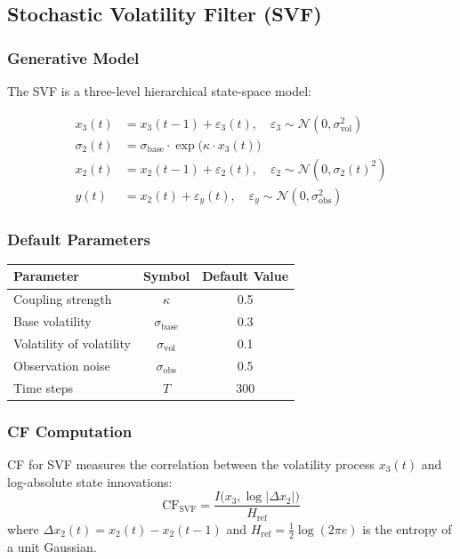 \documentclass[10pt]{article} %
\theoremstyle{plain}
\theoremstyle{definition}
\newcommand{\CF}{\mathrm{CF}}
\newcommand{\MI}{I}
\newcommand{\Ent}{H}
\begin{document}
\subsection{Stochastic Volatility Filter (SVF)}

\subsubsection{Generative Model}

The SVF is a three-level hierarchical state-space model:

\begin{align}
x_3(t) &= x_3(t-1) + \varepsilon_3(t), \quad \varepsilon_3 \sim \mathcal{N}(0, \sigma_{\text{vol}}^2) \label{eq:svf-vol}\\
\sigma_2(t) &= \sigma_{\text{base}} \cdot \exp\bigl(\kappa \cdot x_3(t)\bigr) \label{eq:svf-coupling}\\
x_2(t) &= x_2(t-1) + \varepsilon_2(t), \quad \varepsilon_2 \sim \mathcal{N}(0, \sigma_2(t)^2) \label{eq:svf-state}\\
y(t) &= x_2(t) + \varepsilon_y(t), \quad \varepsilon_y \sim \mathcal{N}(0, \sigma_{\text{obs}}^2) \label{eq:svf-obs}
\end{align}

\subsubsection{Default Parameters}

\begin{center}
\begin{tabular}{lcc}
\toprule
Parameter & Symbol & Default Value \\
\midrule
Coupling strength & $\kappa$ & 0.5 \\
Base volatility & $\sigma_{\text{base}}$ & 0.3 \\
Volatility of volatility & $\sigma_{\text{vol}}$ & 0.1 \\
Observation noise & $\sigma_{\text{obs}}$ & 0.5 \\
Time steps & $T$ & 300 \\
\bottomrule
\end{tabular}
\end{center}

\subsubsection{CF Computation}

CF for SVF measures the correlation between the volatility process $x_3(t)$ and log-absolute state innovations:
\begin{equation}
\CF_{\text{SVF}} = \frac{\MI\bigl(x_3, \log|\Delta x_2|\bigr)}{\Ent_{\text{ref}}}
\end{equation}
where $\Delta x_2(t) = x_2(t) - x_2(t-1)$ and $\Ent_{\text{ref}} = \frac{1}{2}\log(2\pi e)$ is the entropy of a unit Gaussian.
\end{document}
